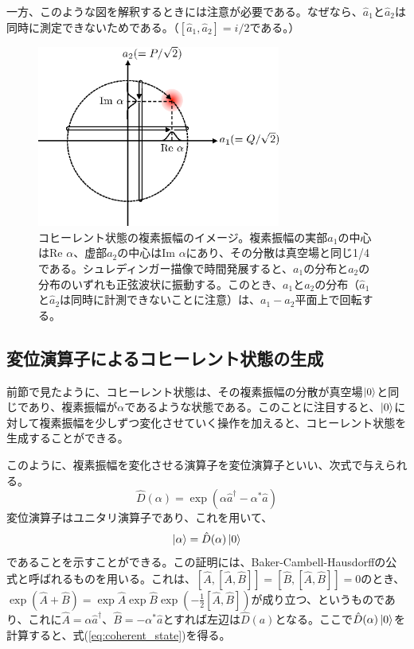 一方、このような図を解釈するときには注意が必要である。なぜなら、$\hat a_1$と$\hat a_2$は同時に測定できないためである。（$[\hat a_1, \hat a_2] = i/2$である。）
\begin{figure}
  \centering
  \includegraphics[width=8cm]{fig/3-2_coherent_state.eps} 
  \caption{コヒーレント状態の複素振幅のイメージ。複素振幅の実部$a_1$の中心はRe $\alpha$、虚部$a_2$の中心はIm $\alpha$にあり、その分散は真空場と同じ1/4である。シュレディンガー描像で時間発展すると、$a_1$の分布と$a_2$の分布のいずれも正弦波状に振動する。このとき、$a_1$と$a_2$の分布（$\hat a_1$と$\hat a_2$は同時に計測できないことに注意）は、$a_1-a_2$平面上で回転する。}
  \label{fig:coherent_state}
\end{figure}

\subsection{変位演算子によるコヒーレント状態の生成}
前節で見たように、コヒーレント状態は、その複素振幅の分散が真空場$\ket 0$と同じであり、複素振幅が$\alpha$であるような状態である。このことに注目すると、$\ket 0$に対して複素振幅を少しずつ変化させていく操作を加えると、コヒーレント状態を生成することができる。

このように、複素振幅を変化させる演算子を変位演算子といい、次式で与えられる。
\begin{equation}
  \hat D(\alpha) = \exp(\alpha \hat a^\dagger - \alpha^*\hat a)
\end{equation}
変位演算子はユニタリ演算子であり、これを用いて、
\begin{equation}
  \ket \alpha = \hat D(\alpha)\ket 0
\end{equation}
であることを示すことができる。この証明には、Baker-Cambell-Hausdorffの公式と呼ばれるものを用いる。これは、$[\hat A, [\hat A, \hat B]] = [\hat B, [\hat A, \hat B]] = 0$のとき、$\exp(\hat A + \hat B) = \exp \hat A \exp \hat B \exp \left(-\frac{1}{2} [\hat A, \hat B]\right)$が成り立つ、というものであり、これに$\hat A = \alpha \hat a^\dagger$、$\hat B = -\alpha^*\hat a$とすれば左辺は$\hat D(a)$となる。ここで$\hat D(\alpha) \ket 0$を計算すると、式(\ref{eq:coherent_state})を得る。

